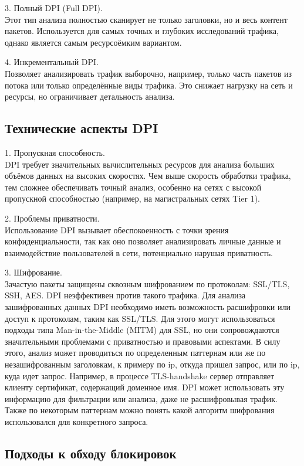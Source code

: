 \documentclass[utf8,14pt,a4paper,oneside,russian]{book}
\begin{document}
3. Полный DPI (Full DPI).\\
Этот тип анализа полностью сканирует не только заголовки, но и весь контент пакетов. Используется для самых точных и глубоких исследований
трафика, однако является самым ресурсоёмким вариантом.

4. Инкрементальный DPI.\\
Позволяет анализировать трафик выборочно, например, только часть пакетов из потока или только определённые виды трафика. Это снижает нагрузку
на сеть и ресурсы, но ограничивает детальность анализа.

\subsection{Технические аспекты DPI}

1. Пропускная способность.\\
DPI требует значительных вычислительных ресурсов для анализа больших объёмов данных на высоких скоростях. Чем выше скорость обработки трафика,
тем сложнее обеспечивать точный анализ, особенно на сетях с высокой пропускной способностью (например, на магистральных сетях Tier 1).

2. Проблемы приватности.\\
Использование DPI вызывает обеспокоенность с точки зрения конфиденциальности, так как оно позволяет анализировать личные данные и взаимодействие
пользователей в сети, потенциально нарушая приватность.

3. Шифрование.\\
Зачастую пакеты защищены сквозным шифрованием по протоколам: SSL/TLS, SSH, AES. DPI неэффективен против такого трафика. Для анализа
зашифрованных данных DPI необходимо иметь возможность расшифровки или доступ к протоколам, таким как SSL/TLS. Для этого могут использоваться
подходы типа Man-in-the-Middle (MITM) для SSL, но они сопровождаются значительными проблемами с приватностью и правовыми аспектами.
В силу этого, анализ может проводиться по определенным паттернам или же по незашифрованным заголовкам, к примеру по ip, откуда пришел запрос,
или по ip, куда идет запрос. Например, в процессе TLS-handshake сервер отправляет клиенту сертификат, содержащий доменное имя. DPI может
использовать эту информацию для фильтрации или анализа, даже не расшифровывая трафик. Также по некоторым паттернам можно понять какой алгоритм
шифрования использовался для конкретного запроса.

\subsection{Подходы к обходу блокировок}
\end{document}
